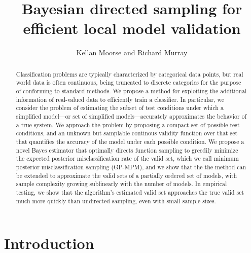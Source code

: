 \documentclass{amsart}
\title{\LARGE \bf
Bayesian directed sampling for efficient local model validation
}
\author{Kellan Moorse and Richard Murray}
\begin{document}
\maketitle
\thispagestyle{empty}
\pagestyle{empty}


\begin{abstract}

Classification problems are typically characterized by categorical data points, but real world data is often continuous, being truncated to discrete categories for the purpose of conforming to standard methods. We propose a method for exploiting the additional information of real-valued data to efficiently train a classifier. In particular, we consider the problem of estimating the subset of test conditions under which a simplified model---or set of simplified models---accurately approximates the behavior of a true system. We approach the problem by proposing a compact set of possible test conditions, and an unknown but samplable continous validity function over that set that quantifies the accuracy of the model under each possible condition. We propose a novel Bayes estimator that optimally directs function sampling to greedily minimize the expected posterior misclassification rate of the valid set, which we call minimum posterior misclassification sampling (GP-MPM), and we show that the the method can be extended to approximate the valid sets of a partially ordered set of models, with sample complexity growing sublinearly with the number of models. In empirical testing, we show that the algorithm's estimated valid set approaches the true valid set much more quickly than undirected sampling, even with small sample sizes.
\end{abstract}


\section{Introduction}
\end{document}
